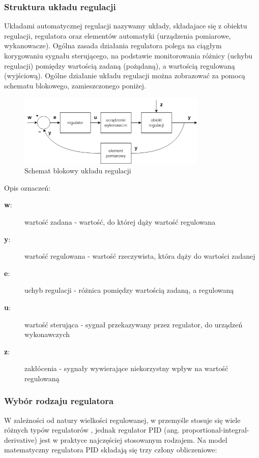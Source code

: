\documentclass[a4paper,twoside,12pt]{book}
\begin{document}
\subsubsection{Struktura układu regulacji}
Układami automatycznej regulacji nazywamy układy, składajace się z obiektu regulacji, regulatora oraz elementów automatyki (urządzenia pomiarowe, wykanowacze). Ogólna zasada działania regulatora polega na ciągłym korygowaniu sygnału sterującego, na podstawie monitorowania różnicy (uchybu regulacji) pomiędzy wartością zadaną (pożądaną), a wartością regulowaną (wyjściową). Ogólne działanie układu regulacji można zobrazować za pomocą schematu blokowego, zamieszczonego poniżej.

\begin{figure}[h]
	\centering
	\includegraphics[width=0.8\textwidth]{./img/regulacja.png}
	\caption{Schemat blokowy układu regulacji}
	\label{fig:regulacja}
\end{figure}

\noindent Opis oznaczeń:
\begin{description}
	\item[\textbf{w}:]wartość zadana - wartość, do której dąży wartość regulowana
	\item[\textbf{y}:]wartość regulowana - wartość rzeczywista, która dąży do wartości zadanej
	\item[\textbf{e}:]uchyb regulacji - różnica pomiędzy wartością zadaną, a regulowaną
	\item[\textbf{u}:]wartość sterująca - sygnał przekazywany przez regulator, do urządzeń wykonawczych
	\item[\textbf{z}:]zakłócenia - sygnały wywierające niekorzystny wpływ na wartość regulowaną
\end{description}

\newpage
\subsubsection{Wybór rodzaju regulatora}
W zależności od natury wielkości regulowanej, w przemyśle stosuje się wiele różnych typów regulatorów \cite{chuong2017identification, han2009pid, laszczyk2013comparison}, jednak regulator PID (ang. proportional-integral-derivative) jest w praktyce najczęściej stosowanym rodzajem. Na model matematyczny regulatora PID składają się trzy człony obliczeniowe:
\end{document}
